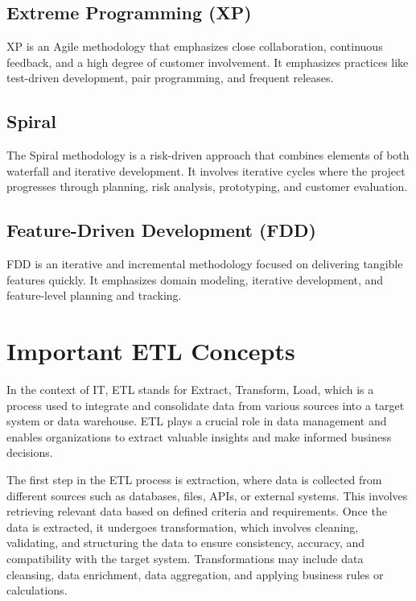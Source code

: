 \section{Extreme Programming (XP)}

XP is an Agile methodology that emphasizes close collaboration, continuous feedback, and a high degree of customer involvement. It emphasizes practices like test-driven development, pair programming, and frequent releases.

\section{Spiral}

The Spiral methodology is a risk-driven approach that combines elements of both waterfall and iterative development. It involves iterative cycles where the project progresses through planning, risk analysis, prototyping, and customer evaluation.

\section{Feature-Driven Development (FDD)}

FDD is an iterative and incremental methodology focused on delivering tangible features quickly. It emphasizes domain modeling, iterative development, and feature-level planning and tracking.

\chapter{Important ETL Concepts}

In the context of IT, ETL stands for Extract, Transform, Load, which is a process used to integrate and consolidate data from various sources into a target system or data warehouse. ETL plays a crucial role in data management and enables organizations to extract valuable insights and make informed business decisions.

The first step in the ETL process is extraction, where data is collected from different sources such as databases, files, APIs, or external systems. This involves retrieving relevant data based on defined criteria and requirements. Once the data is extracted, it undergoes transformation, which involves cleaning, validating, and structuring the data to ensure consistency, accuracy, and compatibility with the target system. Transformations may include data cleansing, data enrichment, data aggregation, and applying business rules or calculations.

